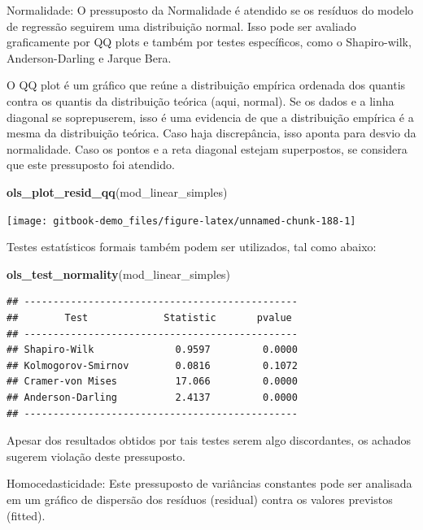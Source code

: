 \documentclass[
]{book}
\newenvironment{Shaded}{\begin{snugshade}}{\end{snugshade}}
\newcommand{\KeywordTok}[1]{\textcolor[rgb]{0.13,0.29,0.53}{\textbf{#1}}}
\newcommand{\NormalTok}[1]{#1}
\begin{document}
Normalidade: O pressuposto da Normalidade é atendido se os resíduos do
modelo de regressão seguirem uma distribuição normal. Isso pode ser
avaliado graficamente por QQ plots e também por testes específicos, como
o Shapiro-wilk, Anderson-Darling e Jarque Bera.

O QQ plot é um gráfico que reúne a distribuição empírica ordenada dos
quantis contra os quantis da distribuição teórica (aqui, normal). Se os
dados e a linha diagonal se soprepuserem, isso é uma evidencia de que a
distribuição empírica é a mesma da distribuição teórica. Caso haja
discrepância, isso aponta para desvio da normalidade. Caso os pontos e a
reta diagonal estejam superpostos, se considera que este pressuposto foi
atendido.

\begin{Shaded}
\begin{Highlighting}[]
\KeywordTok{ols_plot_resid_qq}\NormalTok{(mod_linear_simples)}
\end{Highlighting}
\end{Shaded}

\begin{center}\texttt{[image: gitbook-demo\_files/figure-latex/unnamed-chunk-188-1]} \end{center}

Testes estatísticos formais também podem ser utilizados, tal como
abaixo:

\begin{Shaded}
\begin{Highlighting}[]
\KeywordTok{ols_test_normality}\NormalTok{(mod_linear_simples)}
\end{Highlighting}
\end{Shaded}

\begin{verbatim}
## -----------------------------------------------
##        Test             Statistic       pvalue  
## -----------------------------------------------
## Shapiro-Wilk              0.9597         0.0000 
## Kolmogorov-Smirnov        0.0816         0.1072 
## Cramer-von Mises          17.066         0.0000 
## Anderson-Darling          2.4137         0.0000 
## -----------------------------------------------
\end{verbatim}

Apesar dos resultados obtidos por tais testes serem algo discordantes,
os achados sugerem violação deste pressuposto.

Homocedasticidade: Este pressuposto de variâncias constantes pode ser
analisada em um gráfico de dispersão dos resíduos (residual) contra os
valores previstos (fitted).
\end{document}
